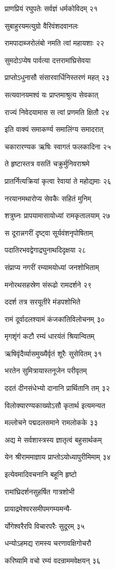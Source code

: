 प्राणप्रियं रघुपतेः सर्वज्ञं धर्मकोविदम् २१

सुबाहुरयमत्युग्रो वैरिवंशदवानलः

रामपादाब्जरोलंबो नमति त्वां महायशाः २२

सुमदोऽप्येष पार्वत्या दत्तरामांघ्रिसेवया

प्राप्तोऽधुनासौ संसारवार्धिनिस्तरणं महत् २३

सत्यवानयमश्वं यः प्राप्तमाश्रुत्य सेवकात्

राज्यं निवेदयामास स त्वां प्रणमति क्षितौ २४

इति वाक्यं समाकर्ण्य समालिंग्य समादरात्

चकारारण्यक ऋषिः स्वागतं फलकादिना २५

ते हृष्टास्तत्र वसतिं चक्रुर्मुनिवराश्रमे

प्रातर्नित्यक्रियां कृत्वा रेवायां ते महोद्यमाः २६

नरयानमथारोप्य सेवकैः सहितं मुनिम्

शत्रुघ्नः प्रापयामासायोध्यां रामकृतालयाम् २७

स दूरान्नगरीं दृष्ट्वा सूर्यवंशनृपोषिताम्

पदातिरभवद्वेगाद्रघुनाथदिदृक्षया २८

संप्राप्य नगरीं रम्यामयोध्यां जनशोभिताम्

मनोरथसहस्रेण संरूढो रामदर्शने २९

ददर्श तत्र सरयूतीरे मंडपशोभिते

रामं दूर्वादलश्यामं कंजकांतिविलोचनम् ३०

मृगशृंगं कटौ रम्यं धारयंतं श्रियान्वितम्

ऋषिवृंदैर्व्यासमुख्यैर्वृतं शूरैः सुसेवितम् ३१

भरतेन सुमित्रायास्तनूजेन परीवृतम्

ददतं दीनसंधेभ्यो दानानि प्रार्थितानि तम् ३२

विलोक्यारण्यकाख्योऽसौ कृतार्थ इत्यमन्यत

मल्लोचने पद्मदलसमाने रामलोकके ३३

अद्य मे सर्वशास्त्रस्य ज्ञातृत्वं बहुसार्थकम्

येन श्रीराममाज्ञाय प्राप्तोऽयोध्यापुरीमिमाम् ३४

इत्येवमादिवचनानि बहूनि हृष्टो

रामांघ्रिदर्शनसुहर्षित गात्रशोभी

प्रायाद्रमेश्वरसमीपमगम्यमन्यै-

र्योगेश्वरैरपि विचारपरैः सुदूरम् ३५

धन्योऽहमद्य रामस्य चरणावक्षिगोचरौ

करिष्यामि वचो रम्यं वदन्राममवेक्षयन् ३६

